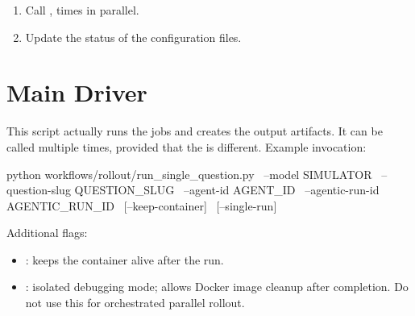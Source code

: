 \documentclass[11pt]{article}
\begin{document}
\begin{enumerate}
  Note instead with   we load the file and skip this step. 
  If  is passed we also delete  and set again to "PENDING" the runs that are set to "ERROR"
  \item Call ,    times in parallel.
  \item Update the status of the configuration files.
\end{enumerate}

\section*{Main Driver}
This script actually runs the jobs and creates the output artifacts. It can be called multiple times, provided that the  is different.
Example invocation:
\begin{DocCode}
python workflows/rollout/run_single_question.py \
  --model SIMULATOR \
  --question-slug QUESTION_SLUG \
  --agent-id AGENT_ID \
  --agentic-run-id AGENTIC_RUN_ID \
  [--keep-container] \
  [--single-run]
\end{DocCode}

Additional flags:
\begin{itemize}
  \item {}: keeps the container alive after the run.
  \item {}: isolated debugging mode; allows Docker image cleanup after completion. 
  Do not use this for orchestrated parallel rollout.
\end{itemize}
\end{document}
